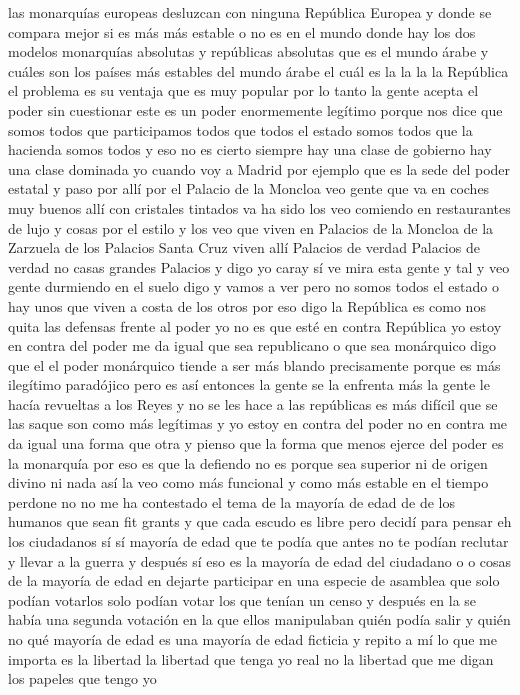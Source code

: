 las monarquías europeas desluzcan con ninguna República Europea y donde se compara mejor
si es más más estable o no es en el mundo donde hay los dos modelos monarquías absolutas y repúblicas absolutas
que es el mundo árabe y cuáles son los países más estables del mundo árabe
el cuál es la la la la República el problema es su ventaja
que es muy popular por lo tanto la gente acepta el poder sin cuestionar
este es un poder enormemente legítimo porque nos dice que somos todos que participamos todos que todos el estado somos todos
que la hacienda somos todos y eso no es cierto siempre hay una clase de gobierno hay una clase dominada
yo cuando voy a Madrid por ejemplo que es la sede del poder estatal y paso por allí por el Palacio de la Moncloa
veo gente que va en coches muy buenos allí con cristales tintados va ha sido
los veo comiendo en restaurantes de lujo y cosas por el estilo y los veo que viven en Palacios de la Moncloa de la Zarzuela
de los Palacios Santa Cruz viven allí Palacios de verdad Palacios de verdad no casas grandes Palacios
y digo yo caray sí ve mira esta gente y tal y veo gente durmiendo en el suelo digo y vamos a ver pero no somos todos el estado
o hay unos que viven a costa de los otros
por eso digo la República es como nos quita las defensas frente al poder
yo no es que esté en contra República yo estoy en contra del poder me da igual que sea republicano o que sea monárquico digo que el el poder monárquico
tiende a ser más blando precisamente porque es más ilegítimo paradójico pero es así entonces
la gente se la enfrenta más la gente le hacía revueltas a los Reyes y no se les hace a las repúblicas es más difícil que se las saque
son como más legítimas y yo estoy en contra del poder no en contra me da igual una forma que otra y pienso que la forma
que menos ejerce del poder es la monarquía por eso es que la defiendo no es porque sea superior ni de origen divino ni nada así
la veo como más funcional y como más estable en el tiempo
perdone no no me ha contestado el tema de la mayoría de edad de de los humanos que sean fit grants y que cada escudo es libre
pero decidí para pensar eh los ciudadanos sí sí mayoría de edad que te podía
que antes no te podían reclutar y llevar a la guerra y después sí eso es la mayoría de edad del ciudadano o o cosas de la mayoría de edad
en dejarte participar en una especie de asamblea que solo podían votarlos solo podían votar los que tenían un censo
y después en la se había una segunda votación en la que ellos manipulaban quién podía salir y quién no qué mayoría de edad
es una mayoría de edad ficticia y repito a mí lo que me importa es la libertad la libertad que tenga yo real no la libertad que me digan los papeles que tengo yo
